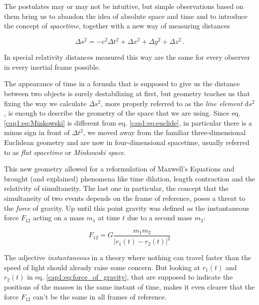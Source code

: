 The postulates may or may not be intuitive, but simple observations based on
them bring us to abandon the idea of absolute space and time and to introduce
the concept of \textit{spacetime}, together with a new way of measuring
distances

\begin{equation}
    \Delta s^2 = - c^2 \Delta t^2 + \Delta x^2 + \Delta y^2 + \Delta z^2 \, .
    \label{cap1:eq:Minkowski}
\end{equation}

In special relativity distances measured this way are the same for every
observer in every inertial frame possible.

The appearance of time in a formula that is supposed to give us the distance
between two objects is surely destabilizing at first, but geometry teaches us
that fixing the way we calculate $\Delta s^2$, more properly referred to as the
\textit{line element} $\mathrm{d}s^2$, is enough to describe the geometry of
the space that we are using.
Since eq. \ref{cap1:eq:Minkowski} is different from eq. \ref{cap1:eq:euclide},
in
particular there is a minus sign in front of $\Delta t^2$, we moved away from
the familiar three-dimensional Euclidean geometry and are now in
four-dimensional spacetime, usually referred to as \textit{flat spacetime} or
\textit{Minkowski space}.

This new geometry allowed for a reformulation of Maxwell's Equations and
brought (and explained) phenomena like time dilation, length contraction and the
relativity of simultaneity.
The last one in particular, the concept that the simultaneity of two events
depends on the frame of reference, poses a threat to the \textit{force} of
gravity.
Up until this point gravity was defined as the instantaneous force $F_{12}$
acting on a mass $m_1$ at time $t$ due to a second mass $m_2$:

\begin{equation}
    F_{12} = G \frac{m_1 m_2}{|r_1(t) - r_2(t)|^2}
    \label{cap1:eq:force_of_gravity}
\end{equation}

The adjective \textit{instantaneous} in a theory where nothing can travel
faster than the speed of light should already raise some concern.
But looking at $r_1(t)$ and $r_2(t)$ in eq. \ref{cap1:eq:force_of_gravity},
that are
supposed to indicate the positions of the masses in the same instant of time,
makes it even clearer that the force $F_{12}$ can't be the same in all
frames of reference.

